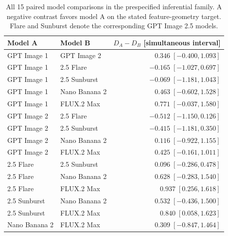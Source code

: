 \begin{table}[htbp]\centering\small
\begin{tabular}{llr}\toprule
Model A & Model B & $D_A-D_B$ [simultaneous interval]\\\midrule
GPT Image 1 & GPT Image 2 & $0.346\;[-0.400,1.093]$\\
GPT Image 1 & 2.5 Flare & $-0.165\;[-1.027,0.697]$\\
GPT Image 1 & 2.5 Sunburst & $-0.069\;[-1.181,1.043]$\\
GPT Image 1 & Nano Banana 2 & $0.463\;[-0.602,1.528]$\\
GPT Image 1 & FLUX.2 Max & $0.771\;[-0.037,1.580]$\\
GPT Image 2 & 2.5 Flare & $-0.512\;[-1.150,0.126]$\\
GPT Image 2 & 2.5 Sunburst & $-0.415\;[-1.181,0.350]$\\
GPT Image 2 & Nano Banana 2 & $0.116\;[-0.922,1.155]$\\
GPT Image 2 & FLUX.2 Max & $0.425\;[-0.161,1.011]$\\
2.5 Flare & 2.5 Sunburst & $0.096\;[-0.286,0.478]$\\
2.5 Flare & Nano Banana 2 & $0.628\;[-0.283,1.540]$\\
2.5 Flare & FLUX.2 Max & $0.937\;[0.256,1.618]$\\
2.5 Sunburst & Nano Banana 2 & $0.532\;[-0.436,1.500]$\\
2.5 Sunburst & FLUX.2 Max & $0.840\;[0.058,1.623]$\\
Nano Banana 2 & FLUX.2 Max & $0.309\;[-0.847,1.464]$\\
\bottomrule\end{tabular}
\caption{All 15 paired model comparisons in the prespecified inferential family. A negative contrast favors model A on the stated feature-geometry target. Flare and Sunburst denote the corresponding GPT Image 2.5 models.}
\label{tab:all-specificity-pairs}\end{table}

